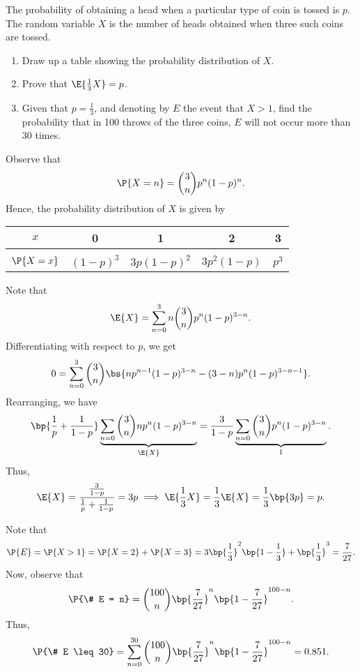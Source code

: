 \begin{problem}
    The probability of obtaining a head when a particular type of coin is tossed is $p$. The random variable $X$ is the number of heads obtained when three such coins are tossed.
    \begin{enumerate}
        \item Draw up a table showing the probability distribution of $X$.
        \item Prove that $\E{\frac13 X} = p$.
        \item Given that $p = \frac13$, and denoting by $E$ the event that $X > 1$, find the probability that in 100 throws of the three coins, $E$ will not occur more than 30 times.
    \end{enumerate}
\end{problem}
\begin{solution}
    \begin{ppart}
        Observe that \[\P{X = n} = \binom{3}{n} p^n (1-p)^n.\] Hence, the probability distribution of $X$ is given by
        \begin{table}[H]
            \centering
            \begin{tabular}{|c|c|c|c|c|}
            \hline
            $x$ & 0 & 1 & 2 & 3  \\ \hline
            &&&&\\[-1em]
            $\P{X = x}$ & $(1-p)^3$ & $3p(1-p)^2$ & $3p^2(1-p)$ & $p^3$ \\[0.2em] \hline
            \end{tabular}
        \end{table}
    \end{ppart}
    \begin{ppart}
        Note that \[\E{X} = \sum_{n = 0}^3 n \binom{3}{n} p^n (1-p)^{3-n}.\] Differentiating with respect to $p$, we get \[0 = \sum_{n = 0}^3 \binom{3}{n} \bs{np^{n-1}(1-p)^{3-n} - (3-n) p^n (1-p)^{3-n-1}}.\] Rearranging, we have \[\bp{\frac1{p} + \frac1{1-p}} \underbrace{\sum_{n = 0} \binom{3}{n} n p^n (1-p)^{3-n}}_{\E{X}} = \frac3{1-p} \underbrace{\sum_{n = 0} \binom{3}{n} p^n (1-p)^{3-n}}_{1}.\] Thus, \[\E{X} = \frac{\frac3{1-p}}{\frac1p + \frac1{1-p}} = 3p \implies \E{\frac13 X} = \frac13 \E{X} = \frac13 \bp{3p} = p.\]
    \end{ppart}
    \begin{ppart}
        Note that \[\P{E} = \P{X > 1} = \P{X = 2} + \P{X = 3} = 3\bp{\frac13}^2 \bp{1 - \frac13} + \bp{\frac13}^3 = \frac7{27}.\] Now, observe that \[\P{\# E = n} = \binom{100}{n} \bp{\frac7{27}}^n \bp{1 - \frac7{27}}^{100 -n}.\] Thus, \[\P{\# E \leq 30} = \sum_{n = 0}^{30} \binom{100}{n} \bp{\frac7{27}}^n \bp{1 - \frac7{27}}^{100 -n} = 0.851.\]
    \end{ppart}
\end{solution}

